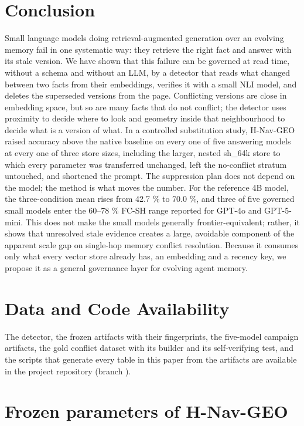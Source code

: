 \documentclass[journal=jcisd8,manuscript=article]{achemso}
\begin{document}
\section{Conclusion}

Small language models doing retrieval-augmented generation over an evolving memory fail in one systematic way: they retrieve the right fact and answer with its stale version. We have shown that this failure can be governed at read time, without a schema and without an LLM, by a detector that reads what changed between two facts from their embeddings, verifies it with a small NLI model, and deletes the superseded versions from the page. Conflicting versions are close in embedding space, but so are many facts that do not conflict; the detector uses proximity to decide where to look and geometry inside that neighbourhood to decide what is a version of what. In a controlled substitution study, H-Nav-GEO raised accuracy above the native baseline on every one of five answering models at every one of three store sizes, including the larger, nested sh\_64k store to which every parameter was transferred unchanged, left the no-conflict stratum untouched, and shortened the prompt. The suppression plan does not depend on the model; the method is what moves the number. For the reference 4B model, the three-condition mean rises from 42.7 \% to 70.0 \%, and three of five governed small models enter the 60--78 \% FC-SH range reported for GPT-4o and GPT-5-mini. This does not make the small models generally frontier-equivalent; rather, it shows that unresolved stale evidence creates a large, avoidable component of the apparent scale gap on single-hop memory conflict resolution. Because it consumes only what every vector store already has, an embedding and a recency key, we propose it as a general governance layer for evolving agent memory.

\section*{Data and Code Availability}

The detector, the frozen artifacts with their fingerprints, the five-model campaign artifacts, the gold conflict dataset with its builder and its self-verifying test, and the scripts that generate every table in this paper from the artifacts are available in the project repository (branch ).

\appendix
\section{Frozen parameters of H-Nav-GEO}
\end{document}
